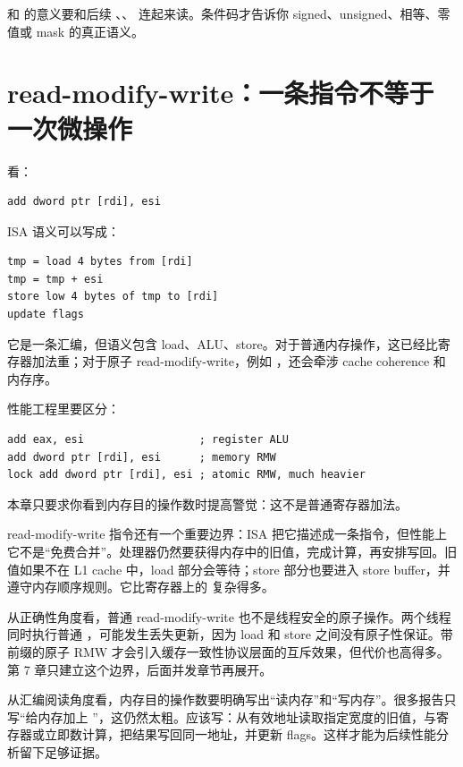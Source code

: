 \begin{keyidea}
 和  的意义要和后续 、、 连起来读。条件码才告诉你 signed、unsigned、相等、零值或 mask 的真正语义。
\end{keyidea}

\section{read-modify-write：一条指令不等于一次微操作}

看：

\begin{lstlisting}
add dword ptr [rdi], esi
\end{lstlisting}

ISA 语义可以写成：

\begin{lstlisting}
tmp = load 4 bytes from [rdi]
tmp = tmp + esi
store low 4 bytes of tmp to [rdi]
update flags
\end{lstlisting}

它是一条汇编，但语义包含 load、ALU、store。对于普通内存操作，这已经比寄存器加法重；对于原子 read-modify-write，例如 ，还会牵涉 cache coherence 和内存序。

性能工程里要区分：

\begin{lstlisting}
add eax, esi                  ; register ALU
add dword ptr [rdi], esi      ; memory RMW
lock add dword ptr [rdi], esi ; atomic RMW, much heavier
\end{lstlisting}

本章只要求你看到内存目的操作数时提高警觉：这不是普通寄存器加法。

read-modify-write 指令还有一个重要边界：ISA 把它描述成一条指令，但性能上它不是“免费合并”。处理器仍然要获得内存中的旧值，完成计算，再安排写回。旧值如果不在 L1 cache 中，load 部分会等待；store 部分也要进入 store buffer，并遵守内存顺序规则。它比寄存器上的  复杂得多。

从正确性角度看，普通 read-modify-write 也不是线程安全的原子操作。两个线程同时执行普通 ，可能发生丢失更新，因为 load 和 store 之间没有原子性保证。带  前缀的原子 RMW 才会引入缓存一致性协议层面的互斥效果，但代价也高得多。第 7 章只建立这个边界，后面并发章节再展开。

从汇编阅读角度看，内存目的操作数要明确写出“读内存”和“写内存”。很多报告只写“给内存加上 ”，这仍然太粗。应该写：从有效地址读取指定宽度的旧值，与寄存器或立即数计算，把结果写回同一地址，并更新 flags。这样才能为后续性能分析留下足够证据。

